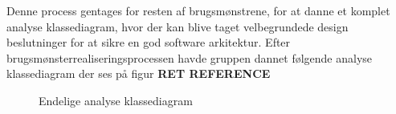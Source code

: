 Denne process gentages for resten af brugsmønstrene, for at danne et komplet analyse klassediagram, hvor der kan blive taget velbegrundede design beslutninger for at sikre en god software arkitektur. Efter brugsmønsterrealiseringsprocessen havde gruppen dannet følgende analyse klassediagram der ses på figur \textbf{RET REFERENCE}


\begin{figure}
{}
    \caption{Endelige analyse klassediagram}
    \label{fig:AnalyseKlasseDiagramV3}
\end{figure}


